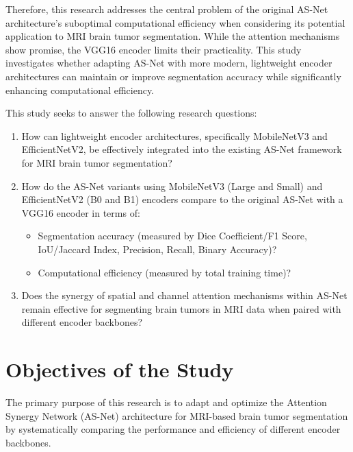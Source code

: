 Therefore, this research addresses the central problem of the original AS-Net architecture's suboptimal computational efficiency when considering its potential application to MRI brain tumor segmentation. While the attention mechanisms show promise, the VGG16 encoder limits their practicality. This study investigates whether adapting AS-Net with more modern, lightweight encoder architectures can maintain or improve segmentation accuracy while significantly enhancing computational efficiency.

This study seeks to answer the following research questions:

\begin{enumerate}
  \item How can lightweight encoder architectures, specifically MobileNetV3 and EfficientNetV2, be effectively integrated into the existing AS-Net framework for MRI brain tumor segmentation?
  \item How do the AS-Net variants using MobileNetV3 (Large and Small) and EfficientNetV2 (B0 and B1) encoders compare to the original AS-Net with a VGG16 encoder in terms of:
    \begin{itemize}
      \item Segmentation accuracy (measured by Dice Coefficient/F1 Score, IoU/Jaccard Index, Precision, Recall, Binary Accuracy)?
      \item Computational efficiency (measured by total training time)?
    \end{itemize}
  \item Does the synergy of spatial and channel attention mechanisms within AS-Net remain effective for segmenting brain tumors in MRI data when paired with different encoder backbones?
\end{enumerate}

\section{Objectives of the Study}

The primary purpose of this research is to adapt and optimize the Attention Synergy Network (AS-Net) architecture for MRI-based brain tumor segmentation by systematically comparing the performance and efficiency of different encoder backbones.

